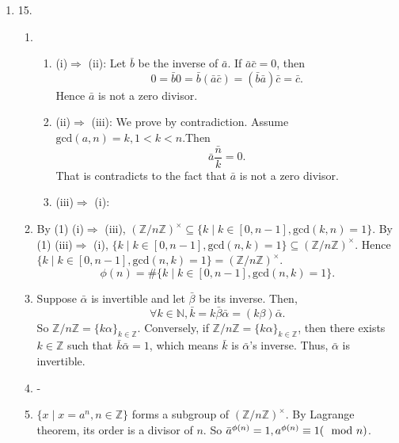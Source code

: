 \documentclass[12pt]{article}
\newcommand{\NN}{\mathbb{N}}
\newcommand{\ZZ}{\mathbb{Z}}
\begin{document}
\begin{enumerate}
\begin{enumerate}
        \end{enumerate}
        \item 15.
            \begin{enumerate}
                \item 
                    \begin{enumerate}
                        \item (i)$\Rightarrow$ (ii): Let $\bar{b}$ be the inverse of $\bar{a}$. If $\bar{a}\bar{c}=0$, then
                            $$0=\bar{b}0=\bar{b}(\bar{a}\bar{c})=(\bar{b}\bar{a})\bar{c}=\bar{c}.$$
                            Hence $\bar{a}$ is not a zero divisor.
                        \item (ii)$\Rightarrow$ (iii): We prove by contradiction. Assume $\mathrm{gcd}(a,n)=k,1<k<n$.Then
                            $$\bar{a}\bar{\frac{n}{k}}=0.$$
                            That is contradicts to the fact that $\bar{a}$ is not a zero divisor.
                        \item (iii)$\Rightarrow$ (i): 
                    \end{enumerate}
                    \item By (1) (i)$\Rightarrow$ (iii), $(\ZZ/n\ZZ)^\times\subseteq\{k\mid k\in [0,n-1], \mathrm{gcd}(k,n)=1\}$.
                        \newline
                        By (1) (iii)$\Rightarrow$ (i), $\{k\mid k\in [0,n-1],\mathrm{gcd}(n,k)=1\}\subseteq (\ZZ/n\ZZ)^\times$.
                        \newline Hence $\{k\mid k\in [0,n-1],\mathrm{gcd}(n,k)=1\}=(\ZZ/n\ZZ)^\times$. 
                        $$\phi(n)=\#\{k\mid k\in [0,n-1],\mathrm{gcd}(n,k)=1\}.$$
                    \item  Suppose $\bar{\alpha}$ is invertible and let $\bar{\beta}$ be its inverse. Then, 
                        $$\forall k\in \NN, \bar{k}=k\bar{\beta}\bar{\alpha}=(k\beta)\bar{\alpha}.$$
                        So $\ZZ/n\ZZ=\{k\alpha\}_{k\in\ZZ}$.
                        \newline
                        Conversely, if $\ZZ/n\ZZ=\{k\alpha\}_{k\in\ZZ}$, then there exists $k\in\ZZ$ such that $\bar{k}\bar{\alpha}=1$, which means $\bar{k}$ is $\bar{\alpha}$'s inverse. Thus, $\bar{\alpha}$ is invertible.
                    \item -
                    \item $\{x\mid x=a^n,n\in\ZZ\}$ forms a subgroup of $(\ZZ/n\ZZ)^\times$. By Lagrange theorem, its order is a divisor of $n$. So $\bar{a}^{\phi(n)}=1, a^{\phi(n)}\equiv 1 (\mathrm{\mod} n )$.

\end{enumerate}
\end{enumerate}
\end{document}

